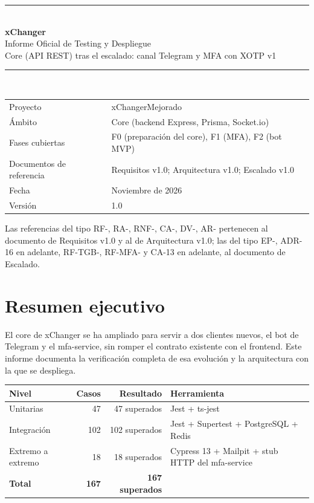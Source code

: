 \documentclass[11pt,a4paper]{report}
\begin{document}
\begin{titlepage}
\centering
\vspace*{3cm}
{\color{marca}\rule{\linewidth}{1pt}}\\[0.6cm]
{\Huge\bfseries xChanger\\[0.3cm]}
{\LARGE Informe Oficial de Testing y Despliegue\\[0.3cm]}
{\large Core (API REST) tras el escalado: canal Telegram y MFA con XOTP v1}\\[0.4cm]
{\color{marca}\rule{\linewidth}{1pt}}\\[2cm]
\begin{tabular}{@{}ll@{}}
\toprule
Proyecto & xChangerMejorado \\
Ámbito & Core (backend Express, Prisma, Socket.io) \\
Fases cubiertas & F0 (preparación del core), F1 (MFA), F2 (bot MVP) \\
Documentos de referencia & Requisitos v1.0; Arquitectura v1.0; Escalado v1.0 \\
Fecha & Noviembre de 2026 \\
Versión & 1.0 \\
\bottomrule
\end{tabular}
\vfill
{\small Las referencias del tipo RF-, RA-, RNF-, CA-, DV-, AR- pertenecen al documento de Requisitos v1.0 y al de Arquitectura v1.0; las del tipo EP-, ADR-16 en adelante, RF-TGB-, RF-MFA- y CA-13 en adelante, al documento de Escalado.}
\end{titlepage}

\tableofcontents

\chapter{Resumen ejecutivo}

El core de xChanger se ha ampliado para servir a dos clientes nuevos, el bot de Telegram y el mfa-service, sin romper el contrato existente con el frontend. Este informe documenta la verificación completa de esa evolución y la arquitectura con la que se despliega.

\begin{center}
\begin{tabular}{@{}lrrl@{}}
\toprule
Nivel & Casos & Resultado & Herramienta \\
\midrule
Unitarias & 47 & 47 superados & Jest + ts-jest \\
Integración & 102 & 102 superados & Jest + Supertest + PostgreSQL + Redis \\
Extremo a extremo & 18 & 18 superados & Cypress 13 + Mailpit + stub HTTP del mfa-service \\
\midrule
\textbf{Total} & \textbf{167} & \textbf{167 superados} & \\
\bottomrule
\end{tabular}
\end{center}
\end{document}
